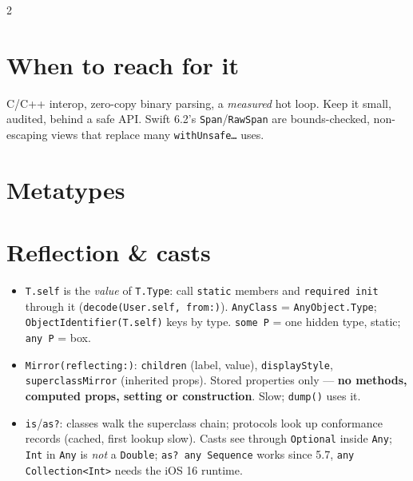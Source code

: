 \documentclass[8pt]{extarticle}
\begin{document}
\begin{multicols}{2}
\section{When to reach for it}
C/C++ interop, zero-copy binary parsing, a \emph{measured} hot loop. Keep it
small, audited, behind a safe API. Swift 6.2's \texttt{Span}/\texttt{RawSpan}
are bounds-checked, non-escaping views that replace many
\texttt{withUnsafe…} uses.

\columnbreak

\section{Metatypes}

\section{Reflection \& casts}
\begin{itemize}
  \item \texttt{T.self} is the \emph{value} of \texttt{T.Type}: call
        \texttt{static} members and \texttt{required init} through it
        (\texttt{decode(User.self, from:)}). \texttt{AnyClass} =
        \texttt{AnyObject.Type}; \texttt{ObjectIdentifier(T.self)} keys by type.
        \texttt{some P} = one hidden type, static; \texttt{any P} = box.
  \item \texttt{Mirror(reflecting:)}: \texttt{children} (label, value),
        \texttt{displayStyle}, \texttt{superclassMirror} (inherited props).
        Stored properties only — \textbf{no methods, computed props,
        setting or construction}. Slow; \texttt{dump()} uses it.
  \item \texttt{is}/\texttt{as?}: classes walk the superclass chain;
        protocols look up conformance records (cached, first lookup slow).
        Casts see through \texttt{Optional} inside \texttt{Any}; \texttt{Int}
        in \texttt{Any} is \emph{not} a \texttt{Double}; \texttt{as? any
        Sequence} works since 5.7, \texttt{any Collection<Int>} needs the
        iOS 16 runtime.
\end{itemize}


\end{multicols}
\end{document}
